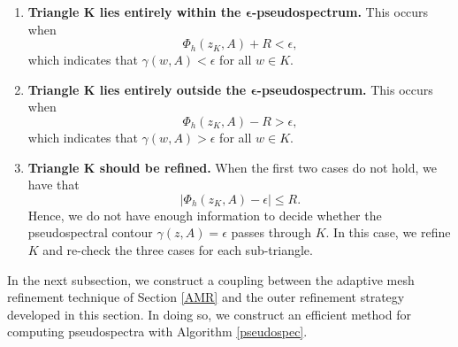 \begin{enumerate}[label=\textbf{\arabic*}.] 

\item \textbf{Triangle $\boldsymbol{K}$ lies entirely within the $\mathbf{\epsilon}$-pseudospectrum.}
This occurs when
\begin{equation}\label{case 1}
    \Phi_h(z_K,A) + R < \epsilon,
\end{equation}
which indicates that $\gamma(w,A) < \epsilon$ for all $w \in K$.

\item \textbf{Triangle $\boldsymbol{K}$ lies entirely outside the $\mathbf{\epsilon}$-pseudospectrum.}
This occurs when
\begin{equation}\label{case 2}
    \Phi_h(z_K,A) - R > \epsilon,
\end{equation}
which indicates that $\gamma(w,A) > \epsilon$ for all $w \in K$.
    

\item \textbf{Triangle $\boldsymbol{K}$ should be refined.}
When the first two cases do not hold, we have that
\begin{equation}\label{case 3}
    |\Phi_h(z_K,A) - \epsilon| \le R.
\end{equation}
Hence, we do not have enough information to decide whether the pseudospectral contour $\gamma(z, A) = \epsilon$ passes through $K.$ In this case, we refine $K$ and re-check the three cases for each sub-triangle.  
\end{enumerate}

In the next subsection, we construct a coupling between the adaptive mesh refinement technique of Section \ref{AMR} and the outer refinement strategy developed in this section. In doing so, we construct an efficient method for computing pseudospectra with Algorithm \ref{pseudospec}. 


